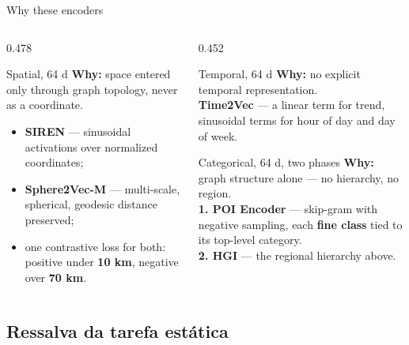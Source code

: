 \documentclass{beamer}
\begin{document}
\begin{frame}{Why these encoders}
    \begin{columns}[T,onlytextwidth]
        \begin{column}{0.478\textwidth}
            \begin{block}{Spatial, 64 d}
                \footnotesize
                \textbf{Why:} space entered only through graph topology, never as a coordinate.
                \begin{itemize}\setlength{\itemsep}{3pt}
                    \item \textbf{SIREN} --- sinusoidal activations over normalized coordinates;
                    \item \textbf{Sphere2Vec-M} --- multi-scale, spherical, geodesic distance preserved;
                    \item one contrastive loss for both: positive under \textbf{10 km}, negative
                          over \textbf{70 km}.
                \end{itemize}
            \end{block}
        \end{column}
        \hfill
        \begin{column}{0.452\textwidth}
            \begin{block}{Temporal, 64 d}
                \footnotesize
                \textbf{Why:} no explicit temporal representation.\\
                \textbf{Time2Vec} --- a linear term for trend, sinusoidal terms for hour of day
                and day of week.
            \end{block}
            \begin{block}{Categorical, 64 d, two phases}
                \footnotesize
                \textbf{Why:} graph structure alone --- no hierarchy, no region.\\
                \textbf{1. POI Encoder} --- skip-gram with negative sampling, each \textbf{fine
                class} tied to its top-level category.\\
                \textbf{2. HGI} --- the regional hierarchy above.
            \end{block}
        \end{column}
    \end{columns}
\end{frame}

\subsection{Ressalva da tarefa estática}
\end{document}
